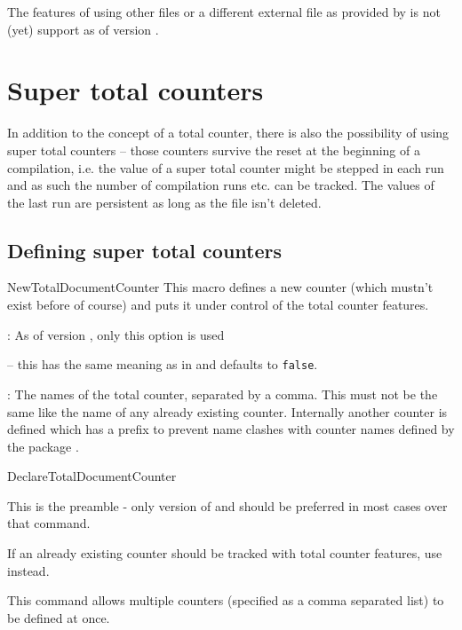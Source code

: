 \documentclass[12pt,a4paper,oneside]{article}
\makeatletter
\newcommand{\chdocextractversion}[1]{%
  \@nameuse{#1}%
}
\renewcommand{\tcbdocnew}[1]{#1}%
\renewcommand{\tcbdocupdated}[1]{#1}%
\newcommand{\CHDocUpdate}[1]{\tcbdocmarginnote[doclang/updated={},colback={yellow},colframe={yellow!50!red},  fontupper={\tiny}
]{%
  \tcbdocupdated{\chdocextractversion{xassoccntversion#1}}%
}%
}
\def\packageversion{\xassoccntpackageversion}%
\makeatother
\begin{document}
\begin{marker}
  The features of using other  files or a different external file as provided by  is not (yet) support as of version \packageversion. 
\end{marker}



\section{Super total counters}\label{section:supertotalcounters} \tcbdocmarginnote{\tcbdocnew{2015-11-25}}
In addition to the concept of a total counter, there is also the possibility of using super total counters -- those counters survive the reset at the beginning of a compilation, i.e. the value of a super total counter might be stepped in each run and as such the number of compilation runs etc. can be tracked. The values of the last run are persistent as long as the  file isn't deleted. 

\subsection{Defining super total counters}

\begin{docCommand}{NewTotalDocumentCounter}{}
This macro defines a new counter (which mustn't exist before of course) and puts it under control of the total counter features. 
\begin{codeoptionsenum}
  \item {}: As of version \packageversion, only this option is used

     -- this has the same meaning as in  and defaults to \texttt{false}. 

  \item {}: The names of the total counter, separated by a comma. This must not be the same like the name of any already existing counter. Internally another counter is defined which has a prefix to prevent name clashes with counter names defined by the package . 
  \end{codeoptionsenum}

\end{docCommand}

\begin{docCommand}{DeclareTotalDocumentCounter}{}

This is the preamble - only version of  and should be preferred in most cases over that command. 

If an already existing counter should be tracked with total counter features, 
use  instead. 

\CHDocUpdate{1.2}This command allows multiple counters (specified as a comma separated list) to be defined at once.

\end{docCommand}
\end{document}
